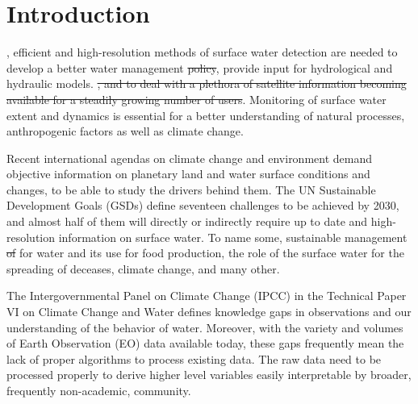 \chapter{Introduction}

\label{intro}

, efficient and high-resolution methods of surface water detection are needed to develop a better water management \st{policy}, provide input for hydrological and hydraulic models. \st{, and to deal with a plethora of satellite information becoming available for a steadily growing number of users}.  Monitoring of surface water extent and dynamics is essential for a better understanding of natural processes, anthropogenic factors as well as climate change. 

Recent international agendas on climate change and environment demand objective information on planetary land and water surface conditions and changes, to be able to study the drivers behind them. The UN Sustainable Development Goals (GSDs)  define seventeen challenges to be achieved by 2030, and almost half of them will directly or indirectly require up to date and high-resolution information on surface water. To name some, sustainable management \st{of} for water and its use for food production, the role of the surface water for the spreading of deceases, climate change, and many other. 

The Intergovernmental Panel on Climate Change (IPCC) in the Technical Paper VI on Climate Change and Water defines knowledge gaps in observations and our understanding of the behavior of water. Moreover, with the variety and volumes of Earth Observation (EO) data available today, these gaps frequently mean the lack of proper algorithms to process existing data. The raw data need to be processed properly to derive higher level variables easily interpretable by broader, frequently non-academic, community. 

